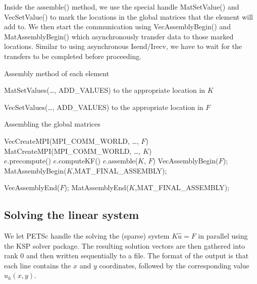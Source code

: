 \documentclass[12pt,notitlepage]{extreport}
\begin{document}
Inside the assemble() method, we use the special handle MatSetValue() and VecSetValue() to mark the locations in the global matrices that the element will add to. We then start the communication using VecAssemblyBegin() and MatAssemblyBegin() which asynchronously transfer data to those marked locations. Similar to using asynchronous Isend/Irecv, we have to wait for the transfers to be completed before proceeding.

\begin{algorithm}[htp]
  \caption{Assembly method of each element}
  \begin{algorithmic}
    \State MatSetValues(\ldots, ADD\_VALUES) to the appropriate location in $K$
    \EndIf
    \EndFor

    \State VecSetValues(\ldots, ADD\_VALUES) to the appropriate location in $F$
    \EndIf
    \EndFor
    \EndProcedure
  \end{algorithmic}
\end{algorithm}

\begin{algorithm}[htp]
  \caption{Assembling the global matrices}
  \begin{algorithmic}
    \State VecCreateMPI(MPI\_COMM\_WORLD, \ldots, $F$)
    \State MatCreateMPI(MPI\_COMM\_WORLD, \ldots, $K$) \\
    \State $e$.precompute() 
    \State $e$.computeKF() 
    \State $e$.assemble($K$, $F$)
    \EndFor
    \State VecAssemblyBegin($F$);
    \State MatAssemblyBegin($K$,MAT\_FINAL\_ASSEMBLY);

    \State VecAssemblyEnd($F$);
    \State MatAssemblyEnd($K$,MAT\_FINAL\_ASSEMBLY);
  \end{algorithmic}
\end{algorithm}

\subsection*{Solving the linear system}
We let PETSc handle the solving the (sparse) system $K\hat{u} = F$ in parallel using the KSP solver package. The resulting solution vectors are then gathered into rank 0 and then written sequentially to a file. The format of the output is that each line contains the $x$ and $y$ coordinates, followed by the corresponding value $u_h(x,y)$.
\end{document}
